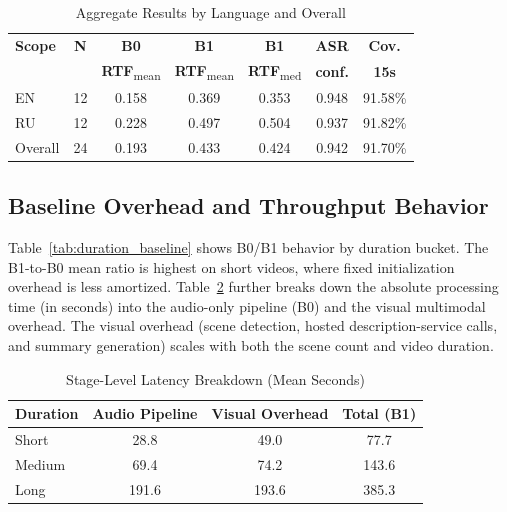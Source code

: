 \documentclass[conference]{IEEEtran}
\begin{document}
\begin{table}[t]
\caption{Aggregate Results by Language and Overall}
\label{tab:lang_overall}
\centering
\footnotesize
\setlength{\tabcolsep}{4.2pt}
\begin{tabular}{lcccccc}
\toprule
\textbf{Scope} & \textbf{N} & \textbf{B0} & \textbf{B1} & \textbf{B1} & \textbf{ASR} & \textbf{Cov.} \\
 &  & \textbf{RTF}\textsubscript{mean} & \textbf{RTF}\textsubscript{mean} & \textbf{RTF}\textsubscript{med} & \textbf{conf.} & \textbf{15s} \\
\midrule
EN & 12 & 0.158 & 0.369 & 0.353 & 0.948 & 91.58\% \\
RU & 12 & 0.228 & 0.497 & 0.504 & 0.937 & 91.82\% \\
Overall & 24 & 0.193 & 0.433 & 0.424 & 0.942 & 91.70\% \\
\bottomrule
\end{tabular}
\end{table}

\subsection{Baseline Overhead and Throughput Behavior}
Table~\ref{tab:duration_baseline} shows B0/B1 behavior by duration bucket. The B1-to-B0 mean ratio is highest on short videos, where fixed initialization overhead is less amortized. Table~\ref{tab:stage_latency} further breaks down the absolute processing time (in seconds) into the audio-only pipeline (B0) and the visual multimodal overhead. The visual overhead (scene detection, hosted description-service calls, and summary generation) scales with both the scene count and video duration.

\begin{table}[t]
\caption{Stage-Level Latency Breakdown (Mean Seconds)}
\label{tab:stage_latency}
\centering
\footnotesize
\setlength{\tabcolsep}{5pt}
\begin{tabular}{lccc}
\toprule
\textbf{Duration} & \textbf{Audio Pipeline} & \textbf{Visual Overhead} & \textbf{Total (B1)} \\
\midrule
Short & 28.8 & 49.0 & 77.7 \\
Medium & 69.4 & 74.2 & 143.6 \\
Long & 191.6 & 193.6 & 385.3 \\
\bottomrule
\end{tabular}
\end{table}
\end{document}
